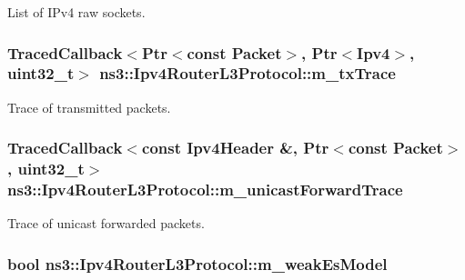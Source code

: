 List of I\-Pv4 raw sockets. 

\hypertarget{classns3_1_1Ipv4RouterL3Protocol_a4d2088884f46909d02a7d0afc97df51f}{
\subsubsection[{m\-\_\-tx\-Trace}]{\setlength{\rightskip}{0pt plus 5cm}Traced\-Callback$<$Ptr$<$const Packet$>$, Ptr$<$Ipv4$>$, uint32\-\_\-t$>$ ns3\-::\-Ipv4\-Router\-L3\-Protocol\-::m\-\_\-tx\-Trace\hspace{0.3cm}{\ttfamily [private]}}}\label{classns3_1_1Ipv4RouterL3Protocol_a4d2088884f46909d02a7d0afc97df51f}


Trace of transmitted packets. 

\hypertarget{classns3_1_1Ipv4RouterL3Protocol_aa4866fa965886a7eebb4a8c3d3ca06f6}{
\subsubsection[{m\-\_\-unicast\-Forward\-Trace}]{\setlength{\rightskip}{0pt plus 5cm}Traced\-Callback$<$const Ipv4\-Header \&, Ptr$<$const Packet$>$, uint32\-\_\-t$>$ ns3\-::\-Ipv4\-Router\-L3\-Protocol\-::m\-\_\-unicast\-Forward\-Trace\hspace{0.3cm}{\ttfamily [private]}}}\label{classns3_1_1Ipv4RouterL3Protocol_aa4866fa965886a7eebb4a8c3d3ca06f6}


Trace of unicast forwarded packets. 

\hypertarget{classns3_1_1Ipv4RouterL3Protocol_aa2364dafdd7d767041db38411457bd0c}{
\subsubsection[{m\-\_\-weak\-Es\-Model}]{\setlength{\rightskip}{0pt plus 5cm}bool ns3\-::\-Ipv4\-Router\-L3\-Protocol\-::m\-\_\-weak\-Es\-Model\hspace{0.3cm}{\ttfamily [private]}}}\label{classns3_1_1Ipv4RouterL3Protocol_aa2364dafdd7d767041db38411457bd0c}


